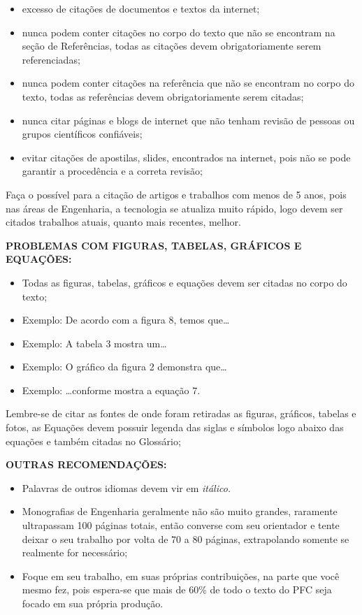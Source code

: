 \begin{itemize}
    \item excesso de citações de documentos e textos  da internet;
    \item nunca podem conter citações no corpo do texto que não se encontram na seção de Referências, todas as citações devem obrigatoriamente serem referenciadas;
    \item nunca podem conter citações na referência que não se encontram no corpo do texto, todas as referências devem obrigatoriamente serem citadas;
    \item nunca citar páginas e blogs de internet que não tenham revisão de pessoas ou grupos científicos confiáveis;
    \item evitar citações de apostilas, slides, encontrados na internet, pois não se pode garantir a procedência e a correta revisão;  
\end{itemize}

\begin{CaixaVerde}
    Faça o possível para a citação de artigos e trabalhos com menos de 5 anos, pois nas áreas de Engenharia, a tecnologia se atualiza muito rápido, logo devem ser citados trabalhos atuais, quanto mais recentes, melhor.
\end{CaixaVerde}

{\bf PROBLEMAS COM FIGURAS, TABELAS,
GRÁFICOS E EQUAÇÕES:}

\begin{itemize}
    \item Todas as figuras, tabelas, gráficos e equações devem ser citadas no corpo do texto;
    \item Exemplo: De acordo com a figura 8, temos que\ldots
    \item Exemplo: A tabela 3 mostra um\ldots
    \item Exemplo: O gráfico da figura 2 demonstra que\ldots
    \item Exemplo: \ldots conforme mostra a equação 7.
\end{itemize}

\begin{CaixaVerde}
    Lembre-se de citar as fontes de onde foram retiradas as figuras, gráficos, tabelas e fotos, as Equações devem possuir legenda das siglas e símbolos logo abaixo das equações e também citadas no Glossário;
\end{CaixaVerde}

{\bf OUTRAS RECOMENDAÇÕES:}

\begin{itemize}
    \item Palavras de outros idiomas devem vir em \textit{itálico.}
    \item Monografias de Engenharia geralmente não são muito grandes, raramente ultrapassam 100 páginas totais, então converse com seu orientador e tente deixar o seu trabalho por volta de 70 a 80 páginas, extrapolando somente se  realmente for necessário;
    \item Foque em seu trabalho, em suas próprias contribuições, na parte que você mesmo fez, pois espera-se que mais de 60\% de todo o texto do PFC seja focado em sua própria produção.
\end{itemize}

